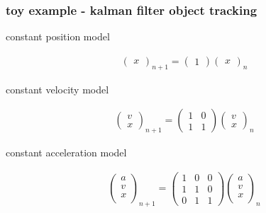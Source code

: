 \documentclass{beamer}
\begin{document}
\begin{frame}
  \frametitle{\bf toy example - kalman filter object tracking}

  constant position model 
  
  \begin{align*}
    \begin{pmatrix}
      x
    \end{pmatrix}_{n+1} = 
    \begin{pmatrix}
      1
    \end{pmatrix}
    \begin{pmatrix}
      x
    \end{pmatrix}_{n}
  \end{align*}
  
  constant velocity model 
  
  \begin{align*}
    \begin{pmatrix}
      v \\
      x
    \end{pmatrix}_{n+1} = 
    \begin{pmatrix}
      1 & 0 \\
      1 & 1
    \end{pmatrix}
    \begin{pmatrix}
      v \\
      x
    \end{pmatrix}_{n}
  \end{align*}


  constant acceleration model 
  
  \begin{align*}
    \begin{pmatrix}
      a \\
      v \\
      x \\
    \end{pmatrix}_{n+1} = 
    \begin{pmatrix}
      1 & 0 & 0 \\
      1 & 1 & 0 \\
      0 & 1 & 1
    \end{pmatrix}
    \begin{pmatrix}
      a \\
      v \\
      x \\
    \end{pmatrix}_{n}
  \end{align*}


\end{frame}
\end{document}
